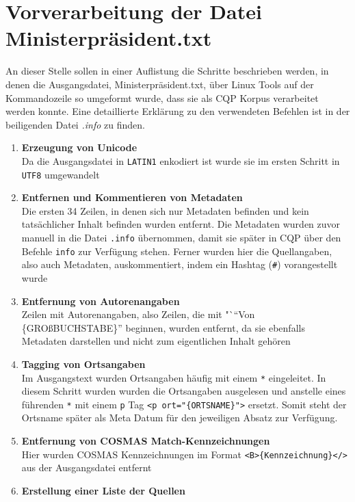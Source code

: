 \documentclass[%
	type=document,%
  	style=article,%
  	media=print,
  	pages=oneside,%
  	prefixLecturer=Dozenten:,
  	author=multiple,
]{unihildesheim} %
\begin{document}
\Titlepage
\cleardoublepage
\TOC
\cleardoublepage

%

\section{Vorverarbeitung der Datei Ministerpräsident.txt}
An dieser Stelle sollen in einer Auflistung die Schritte beschrieben werden,
in denen die Ausgangsdatei, Ministerpräsident.txt, über Linux Tools auf der
Kommandozeile so umgeformt wurde, dass sie als CQP Korpus verarbeitet werden
konnte. Eine detaillierte Erklärung zu den verwendeten Befehlen ist in der
beiligenden Datei \textit{.info} zu finden.
\begin{enumerate}
  \item \textbf{Erzeugung von Unicode}
  \\Da die Ausgangsdatei in \texttt{LATIN1} enkodiert ist
  wurde sie im ersten Schritt in \texttt{UTF8} umgewandelt
  \item \textbf{Entfernen und Kommentieren von Metadaten}
   \\Die ersten 34 Zeilen, in denen sich nur Metadaten befinden und kein
  tatsächlicher Inhalt befinden wurden entfernt. Die Metadaten wurden zuvor
  manuell in die Datei \texttt{.info} übernommen, damit sie später in CQP über
  den Befehle \texttt{info} zur Verfügung stehen. Ferner wurden hier die
  Quellangaben, also auch Metadaten, auskommentiert, indem ein Hashtag
  (\texttt{\#}) vorangestellt wurde
  \item \textbf{Entfernung von Autorenangaben}
  \\ Zeilen mit Autorenangaben, also Zeilen, die mit "`"`Von \{GROßBUCHSTABE\}"'
  beginnen, wurden entfernt, da sie ebenfalls Metadaten darstellen und nicht zum
  eigentlichen Inhalt gehören
  \item \textbf{Tagging von Ortsangaben}
  \\ Im Ausgangstext wurden Ortsangaben häufig mit einem \texttt{*} eingeleitet.
  In diesem Schritt wurden wurden die Ortsangaben ausgelesen und anstelle eines
  führenden \texttt{*} mit einem \texttt{p} Tag \texttt{<p ort="\{ORTSNAME\}">}
  ersetzt.
  Somit steht der Ortsname später als Meta Datum für den jeweiligen Absatz zur Verfügung.
  \item \textbf{Entfernung von COSMAS Match-Kennzeichnungen}
  \\ Hier wurden COSMAS Kennzeichnungen im Format
  \texttt{<B>\{Kennzeichnung\}</>} aus der Ausgangsdatei entfernt
  \item \textbf{Erstellung einer Liste der Quellen}

\end{enumerate}
\end{document}
